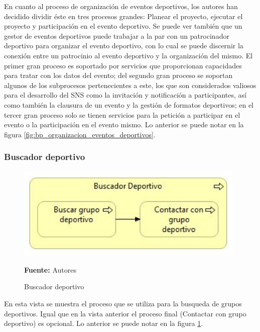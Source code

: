 En cuanto al proceso de organización de eventos deportivos, los autores han decidido dividir éste en tres procesos grandes: Planear el proyecto, ejecutar el proyecto y participación en el evento deportivo. Se puede ver también que un gestor de eventos deportivos puede trabajar a la par con un patrocinador deportivo para organizar el evento deportivo, con lo cual se puede discernir la conexión entre un patrocinio al evento deportivo y la organización del mismo. El primer gran proceso es soportado por servicios que proporcionan capacidades para tratar con los datos del evento; del segundo gran proceso se soportan algunos de los subprocesos pertenecientes a este, los que son considerados valiosos para el desarrollo del SNS como la invitación y notificación a participantes, así como también la clausura de un evento y la gestión de formatos deportivos; en el tercer gran proceso solo se tienen servicios para la petición a participar en el evento o la participación en el evento mismo. Lo anterior se puede notar en la figura \ref{fig:bp_organizacion_eventos_deportivos}.

\subsubsection{Buscador deportivo}

\begin{figure}[!htb]
  \begin{center}
    \includegraphics[width=11cm]{./imagenes/Archimate/vistas/business_process/buscadordeportivo.png}
    \caption{Buscador deportivo}
    \label{fig:BP_BuscadorDeportivo}
    \textbf{Fuente:}  Autores \\
  \end{center}
\end{figure}

En esta vista se muestra el proceso que se utiliza para la busqueda de grupos deportivos. Igual que en la vista anterior el proceso final (Contactar con grupo deportivo) es opcional. Lo anterior se puede notar en la figura \ref{fig:BP_BuscadorDeportivo}.

